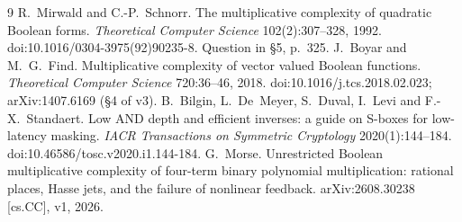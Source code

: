 \begin{thebibliography}{9}
 R.~Mirwald and C.-P.~Schnorr. The multiplicative complexity of quadratic Boolean forms. \emph{Theoretical Computer Science} 102(2):307--328, 1992. doi:10.1016/0304-3975(92)90235-8. Question in \S5, p.~325.
 J.~Boyar and M.~G.~Find. Multiplicative complexity of vector valued Boolean functions. \emph{Theoretical Computer Science} 720:36--46, 2018. doi:10.1016/j.tcs.2018.02.023; arXiv:1407.6169 (\S4 of v3).
 B.~Bilgin, L.~De~Meyer, S.~Duval, I.~Levi and F.-X.~Standaert. Low AND depth and efficient inverses: a guide on S-boxes for low-latency masking. \emph{IACR Transactions on Symmetric Cryptology} 2020(1):144--184. doi:10.46586/tosc.v2020.i1.144-184.
 G.~Morse. Unrestricted Boolean multiplicative complexity of four-term binary polynomial multiplication: rational places, Hasse jets, and the failure of nonlinear feedback. arXiv:2608.30238 [cs.CC], v1, 2026.
\end{thebibliography}
